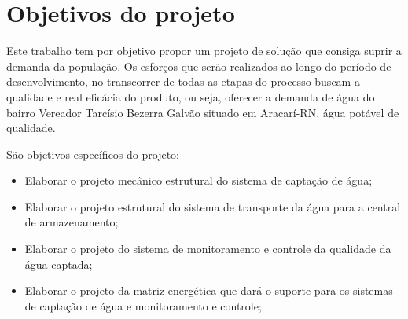 \section*{Objetivos do projeto}
  
  Este trabalho tem por objetivo propor um projeto de solução que consiga suprir a demanda da população. Os esforços que serão
realizados ao longo do período de desenvolvimento, no transcorrer de todas as etapas do processo buscam a qualidade e real
eficácia do produto, ou seja, oferecer a demanda de água do bairro Vereador Tarcísio Bezerra Galvão situado em Aracarí-RN, 
água potável de qualidade.

 São objetivos específicos do projeto:
 \begin{itemize}
  \item Elaborar o projeto mecânico estrutural do sistema de captação de água;
  \item Elaborar o projeto estrutural do sistema de transporte da água para a central de armazenamento;
  \item Elaborar o projeto do sistema de monitoramento e controle da qualidade da água captada;
  \item Elaborar o projeto da matriz energética que dará o suporte para os sistemas de captação de água e monitoramento e controle;
 \end{itemize}
  
